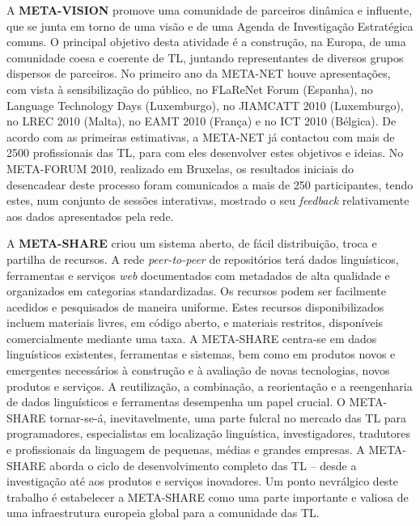 \begin{multicols}{2}
A \textbf{META-VISION} promove uma comunidade de parceiros dinâmica e influente, que se junta em torno de uma visão e de uma Agenda de Investigação Estratégica comuns. O principal objetivo desta atividade é a construção, na Europa, de uma comunidade coesa e coerente de TL, juntando representantes de diversos grupos dispersos de parceiros. No primeiro ano da META-NET houve apresentações, com vista à sensibilização do público, no FLaReNet Forum (Espanha), no Language Technology Days (Lu\-xem\-bur\-go), no JIAMCATT 2010 (Luxemburgo), no LREC 2010 (Malta), no EAMT 2010 (França) e no ICT 2010 (Bélgica). De acordo com as  primeiras estimativas, a META-NET já contactou com mais de 2500 profissionais das TL, para com eles desenvolver estes objetivos e ideias. No META-FORUM 2010, realizado em Bruxelas, os resultados iniciais do desencadear deste processo foram comunicados a mais de 250 participantes, tendo estes, num conjunto de sessões interativas, mostrado o seu \textit{feedback} relativamente aos dados apresentados pela rede.

A \textbf{META-SHARE} criou um sistema aberto, de fácil distribuição, troca e partilha de recursos. A rede \textit{peer-to-peer} de repositórios terá dados linguísticos, ferramentas e serviços \textit{web} documentados com metadados de alta qualidade e organizados em categorias standardizadas. Os recursos podem ser facilmente acedidos e pesquisados de maneira uniforme. Estes recursos disponibilizados incluem materiais livres, em código aberto, e materiais restritos, disponíveis comercialmente mediante uma taxa. A META-SHARE centra-se em dados linguísticos existentes, ferramentas e sistemas, bem como em produtos novos e emergentes necessários à construção e à avaliação de novas tecnologias, novos produtos e serviços. A reutilização, a combinação, a reorientação e a reengenharia de dados linguísticos e ferramentas desempenha um papel crucial. O META- SHARE tornar-se-á, inevitavelmente, uma parte fulcral no mercado das TL para programadores, especialistas em localização linguística, investigadores, tradutores e profissionais da linguagem de pequenas, médias e grandes empresas. A META-SHARE aborda o ciclo de desenvolvimento completo das TL – desde a investigação até aos produtos e serviços inovadores. Um ponto nevrálgico deste trabalho é estabelecer a META-SHARE como uma parte importante e valiosa de uma infraestrutura europeia global para a comunidade das TL.


\end{multicols}
